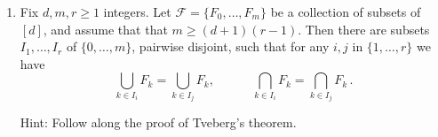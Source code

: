 \documentclass[kulak]{tplt}
\theoremstyle{definition}
\newcommand{\FF}{\mathcal F}
\begin{document}
\begin{enumerate}
\item 
Fix $d, m, r\geq 1$ integers.
Let $\FF = \{ F_0, \ldots, F_m\}$ be a collection of subsets of $[d]$, and assume that that $m \geq (d+1)(r-1)$.
Then there are subsets $I_1, \ldots , I_r$ of $\{0, \ldots, m\}$, pairwise disjoint, such that for any $i, j$ in $\{1, \ldots, r \}$ we have
$$ \bigcup_{k \in I_i} F_k = \bigcup_{k \in I_j} F_k , \quad \quad \quad \bigcap_{k \in I_i} F_k = \bigcap_{k \in I_j} F_k \, .$$

Hint: Follow along the proof of Tveberg's theorem.

\end{enumerate}
\end{document}
